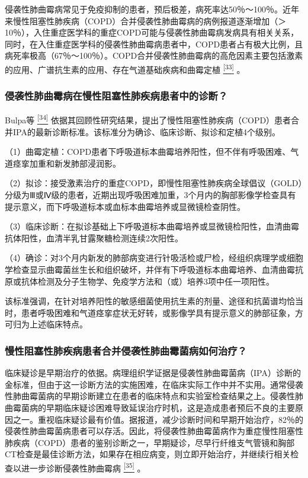 侵袭性肺曲霉病常见于免疫抑制的患者，预后极差，病死率达50％～100％。近年来慢性阻塞性肺疾病（COPD）合并侵袭性肺曲霉病的病例报道逐渐增加（＞10％），入住重症医学科的重症COPD可能与侵袭性肺曲霉病发病具有相关关系，同时，在入住重症医学科的侵袭性肺曲霉病患者中，COPD患者占有极大比例，且病死率极高（67％～100％）。COPD合并侵袭性肺曲霉病的高危因素主要包括激素的应用、广谱抗生素的应用、存在气道基础疾病和曲霉定植
\protect\hyperlink{text00012.htmlux5cux23ch33-11}{\textsuperscript{{[}33{]}}}
。

\subsubsection{侵袭性肺曲霉病在慢性阻塞性肺疾病患者中的诊断？}

Bulpa等
\protect\hyperlink{text00012.htmlux5cux23ch34-11}{\textsuperscript{{[}34{]}}}
依据其回顾性研究结果，提出了慢性阻塞性肺疾病（COPD）患者合并IPA的最新诊断标准。该标准分为确诊、临床诊断、拟诊和定植4个级别。

（1）曲霉定植：COPD患者下呼吸道标本曲霉培养阳性，但不伴有呼吸困难、气道痉挛加重和新发肺部浸润影。

（2）拟诊：接受激素治疗的重症COPD，即慢性阻塞性肺疾病全球倡议（GOLD）分级为Ⅲ或Ⅳ级的患者，近期出现呼吸困难加重，3个月内的胸部影像学检查具有提示意义，而下呼吸道标本或血标本曲霉培养或显微镜检查阴性。

（3）临床诊断：在拟诊基础上下呼吸道标本曲霉培养或显微镜检阳性，血清曲霉抗体阳性，血清半乳甘露聚糖检测连续2次阳性。

（4）确诊：对3个月内新发的肺部病变进行针吸活检或尸检，经组织病理学或细胞学检查显示曲霉菌丝生长和组织破坏，并伴有下呼吸道标本曲霉培养、血清曲霉抗原或抗体检测及分子生物学、免疫学方法和（或）培养3项中任一项阳性。

该标准强调，在针对培养阳性的敏感细菌使用抗生素的剂量、途径和抗菌谱均恰当时，患者呼吸困难和气道痉挛症状无好转，或影像学具有提示意义的肺部征象，方可归为上述临床特点。

\subsubsection{慢性阻塞性肺疾病患者合并侵袭性肺曲霉菌病如何治疗？}

临床疑诊是早期治疗的依据。病理组织学证据是侵袭性肺曲霉菌病（IPA）诊断的金标准，但由于这一诊断方法的实施困难，在临床实际工作中并不实用。通常侵袭性肺曲霉菌病的早期诊断建立在患者的临床特点和实验室检查结果之上。侵袭性肺曲霉菌病的早期临床疑诊困难导致延误治疗时机，这是造成患者预后不良的主要原因之一。重视临床疑诊最有价值。据报道，减少诊断时间和早期开始治疗，82％的侵袭性肺曲霉菌病患者可以存活。因此，将侵袭性肺曲霉菌病作为重症慢性阻塞性肺疾病（COPD）患者的鉴别诊断之一，早期疑诊，尽早行纤维支气管镜和胸部CT检查是最佳诊断方法，如果存在相应病变，则立即开始治疗，并继续行相关检查以进一步诊断侵袭性肺曲霉病
\protect\hyperlink{text00012.htmlux5cux23ch35-11}{\textsuperscript{{[}35{]}}}
。

